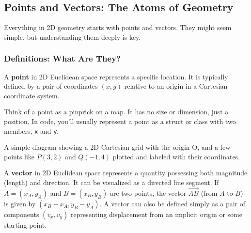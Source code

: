 \subsection{Points and Vectors: The Atoms of Geometry}
\label{ssec:A.1.1}

Everything in 2D geometry starts with points and vectors. They might seem simple, but understanding them deeply is key.

\subsubsection{Definitions: What Are They?}
\label{sssec:A.1.1.1}

\begin{definition}[Point]
\label{def:A.1.1.point}
A \textbf{point} in 2D Euclidean space represents a specific location. It is typically defined by a pair of coordinates $(x, y)$ relative to an origin in a Cartesian coordinate system.
\end{definition}

\begin{intuition}
\label{intuition:A.1.1.point}
Think of a point as a pinprick on a map. It has no size or dimension, just a position. In code, you'll usually represent a point as a struct or class with two members, \texttt{x} and \texttt{y}.
\end{intuition}

\begin{visualexample}
\label{vis:A.1.1.point}
A simple diagram showing a 2D Cartesian grid with the origin O, and a few points like $P(3,2)$ and $Q(-1,4)$ plotted and labeled with their coordinates.
\end{visualexample}

\begin{definition}[Vector]
\label{def:A.1.1.vector}
A \textbf{vector} in 2D Euclidean space represents a quantity possessing both magnitude (length) and direction. It can be visualized as a directed line segment.
If $A=(x_A, y_A)$ and $B=(x_B, y_B)$ are two points, the vector $\vec{AB}$ (from $A$ to $B$) is given by $(x_B - x_A, y_B - y_A)$. A vector can also be defined simply as a pair of components $(v_x, v_y)$ representing displacement from an implicit origin or some starting point.
\end{definition}

